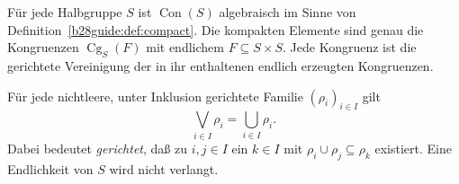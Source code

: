 \begin{theorem}
\label{b28guide:thm:algebraic-congruences}
Für jede Halbgruppe $S$ ist $\operatorname{Con}(S)$ algebraisch
im Sinne von Definition~\ref{b28guide:def:compact}.
Die kompakten Elemente sind genau die Kongruenzen
$\operatorname{Cg}_S(F)$ mit endlichem $F\subseteq S\times S$.
Jede Kongruenz ist die gerichtete Vereinigung der in ihr enthaltenen
endlich erzeugten Kongruenzen.

Für jede nichtleere, unter Inklusion gerichtete Familie
$(\rho_i)_{i\in I}$ gilt
\[
 \bigvee_{i\in I}\rho_i=\bigcup_{i\in I}\rho_i.
\]
Dabei bedeutet \emph{gerichtet}, daß zu $i,j\in I$ ein $k\in I$
mit $\rho_i\cup\rho_j\subseteq\rho_k$ existiert.
Eine Endlichkeit von $S$ wird nicht verlangt. \cite{burris}
\end{theorem}
